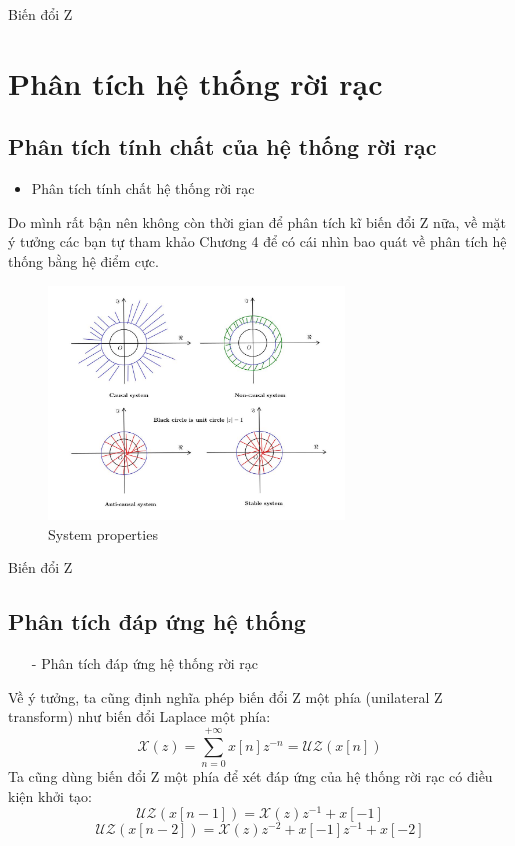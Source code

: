 \documentclass[8pt]{beamer}
\begin{document}
\begin{frame}{Biến đổi Z}
\section{Phân tích hệ thống rời rạc}
\subsection{Phân tích tính chất của hệ thống rời rạc}
\begin{itemize}
\item Phân tích tính chất hệ thống rời rạc
\end{itemize}
Do mình rất bận nên không còn thời gian để phân tích kĩ biến đổi Z nữa, về mặt ý tưởng các bạn tự tham khảo \alert{Chương 4} để có cái nhìn bao quát về phân tích hệ thống bằng hệ điểm cực.
\begin{figure}[h]
\includegraphics[width=0.7\textwidth]{z.jpg}
\caption{System properties}\label{fig:re1}
		\end{figure}
\end{frame}
\begin{frame}{Biến đổi Z}
\subsection{Phân tích đáp ứng hệ thống}
\begin{itemize}
	\item[-] Phân tích đáp ứng hệ thống rời rạc
\end{itemize}
Về ý tưởng, ta cũng định nghĩa phép biến đổi Z một phía (unilateral Z transform) như biến đổi Laplace một phía: $$\mathscr{X}(z)=\sum_{n=0}^{+\infty}x[n]z^{-n}=\mathscr{UZ}(x[n])$$ 
Ta cũng dùng biến đổi Z một phía để xét đáp ứng của hệ thống rời rạc có điều kiện khởi tạo:
$$\mathscr{UZ}(x[n-1])=\mathscr{X}(z)z^{-1}+x[-1]$$
$$\mathscr{UZ}(x[n-2])=\mathscr{X}(z)z^{-2}+x[-1]z^{-1}+x[-2]$$
\end{frame}
\end{document}
